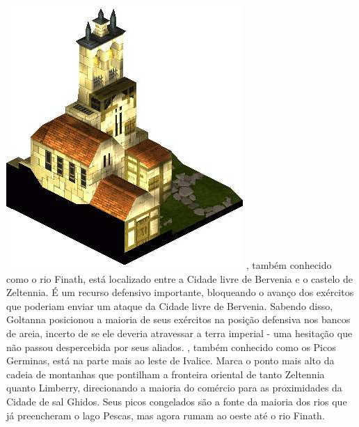 %
\ofpar
\includegraphics[width=\columnwidth]{./art/worldbook/zeltenniachapel.jpg}
\ofpar
%
, também conhecido como o rio Finath, está localizado entre a Cidade livre de Bervenia e o castelo de Zeltennia.
É um recurso defensivo importante, bloqueando o avanço dos exércitos que poderiam enviar um ataque da Cidade livre de Bervenia.
Sabendo disso, Goltanna posicionou a maioria de seus exércitos na posição defensiva nos bancos de areia, incerto de se ele deveria atravessar a terra imperial - uma hesitação que não passou despercebida por seus aliados.
, também conhecido como os Picos Germinas, está na parte mais ao leste de Ivalice. Marca o ponto mais alto da cadeia de montanhas que pontilham a fronteira oriental de tanto Zeltennia quanto Limberry, direcionando a maioria do comércio para as proximidades da Cidade de sal Ghidos.
Seus picos congelados são a fonte da maioria dos rios que já preencheram o lago Pescas, mas agora rumam ao oeste até o rio Finath.
%
\ofpar
